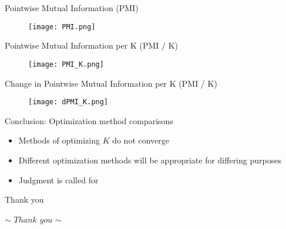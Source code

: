 \documentclass{beamer}
\begin{document}
\begin{frame}{Pointwise Mutual Information (PMI)}
\begin{figure}[htb!]
\texttt{[image: PMI.png]}
\end{figure}
\end{frame}

\begin{frame}{Pointwise Mutual Information per K (PMI / K)}
\begin{figure}[htb!]
\texttt{[image: PMI\_K.png]}
\end{figure}
\end{frame}

\begin{frame}{Change in Pointwise Mutual Information per K (PMI / K)}
\begin{figure}[htb!]
\texttt{[image: dPMI\_K.png]}
\end{figure}
\end{frame}




\begin{frame}{Conclusion: Optimization method comparisons}
\begin{itemize}
\item Methods of optimizing $K$ do not converge
\item Different optimization methods will be appropriate for differing purposes
\item Judgment is called for
\end{itemize}
\end{frame}

\begin{frame}{Thank you}
\begin{center}$\sim$ $Thank$  $you$  $\sim$
\end{center}
\end{frame}
\end{document}
